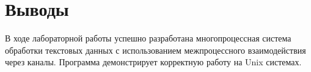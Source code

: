 \section{Выводы}

В ходе лабораторной работы успешно разработана многопроцессная система обработки текстовых данных с использованием межпроцессного взаимодействия через каналы. Программа демонстрирует корректную работу на Unix системах.

\pagebreak